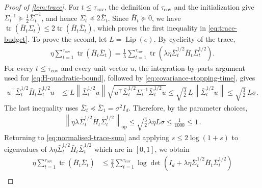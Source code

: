 \documentclass{article}
\newcommand{\tr}{\operatorname{tr}}
\newcommand{\Lip}{\operatorname{Lip}}
\newcommand{\op}{\mathrm{op}}
\newcommand{\1}{\mathbf 1}
\newcommand{\norm}[1]{\left\lVert #1\right\rVert}
\begin{document}
\begin{proof}[Proof of \cref{lem:trace}]
    For $t\leq\tau_{\mathrm{cov}}$, the definition of
    $\tau_{\mathrm{cov}}$ and the initialization give
    $\Sigma_t^{-1}\succeq\frac12\bar{\Sigma}_t^{-1}$, and hence
    $\Sigma_t\preceq2\bar{\Sigma}_t$.
    Since $\bar{H}_t\succeq0$, we have
    $\tr(\bar{H}_t\Sigma_t)\leq2\tr(\bar{H}_t\bar{\Sigma}_t)$,
    which proves the first inequality in \eqref{eq:trace-budget}.
    To prove the second, let $L=\Lip(e)$.
    By cyclicity of the trace,
    \begin{align}
        \eta\sum_{t=1}^{\tau_{\mathrm{cov}}}
        \tr(\bar{H}_t\bar{\Sigma}_t)
        =
        \frac1\lambda\sum_{t=1}^{\tau_{\mathrm{cov}}}
        \tr\left(
        \lambda\eta\bar{\Sigma}_t^{1/2}\bar{H}_t
        \bar{\Sigma}_t^{1/2}
        \right).
        \label{eq:normalised-trace-sum}
    \end{align}
    For every $t\leq\tau_{\mathrm{cov}}$ and every unit vector $u$, the integration-by-parts
    argument used for \eqref{eq:H-quadratic-bound}, followed by
    \eqref{eq:covariance-stopping-time}, gives
    \begin{align}
        u^\top\bar{\Sigma}_t^{1/2}\bar{H}_t
        \bar{\Sigma}_t^{1/2}u
         & \leq
        L\norm{\bar{\Sigma}_t^{1/2}u}
        \sqrt{u^\top\bar{\Sigma}_t^{1/2}
        \Sigma_t^{-1}\bar{\Sigma}_t^{1/2}u}
        \leq
        \sqrt{\frac32}\,L
        \norm{\bar{\Sigma}_t^{1/2}u}
        \leq
        \sqrt{\frac32}\,L\sigma.
        \label{eq:normalised-H}
    \end{align}
    The last inequality uses
    $\bar{\Sigma}_t\preceq\bar{\Sigma}_1=\sigma^2I_d$.
    Therefore, by the parameter choices,
    \begin{align}
        \norm{\eta\lambda\bar{\Sigma}_t^{1/2}\bar{H}_t\bar{\Sigma}_t^{1/2}}_{\op}
        \leq
        \sqrt{\frac32}\lambda\eta L\sigma
        \leq
        \frac1{1000}
        \leq
        1\,.
    \end{align}
    Returning to
    \eqref{eq:normalised-trace-sum} and applying
    $s\leq2\log(1+s)$ to eigenvalues of $\lambda\eta\bar{\Sigma}_t^{1/2}\bar{H}_t\bar{\Sigma}_t^{1/2}$
    which are in $[0,1]$, we obtain
    \begin{align}
        \eta\sum_{t=1}^{\tau_{\mathrm{cov}}}
        \tr(\bar{H}_t\bar{\Sigma}_t)
         & \leq
        \frac2\lambda\sum_{t=1}^{\tau_{\mathrm{cov}}}
        \log\det\left(
        I_d+\lambda\eta\bar{\Sigma}_t^{1/2}\bar{H}_t
        \bar{\Sigma}_t^{1/2}
        \right)                     \\

\end{align}
\end{proof}
\end{document}
